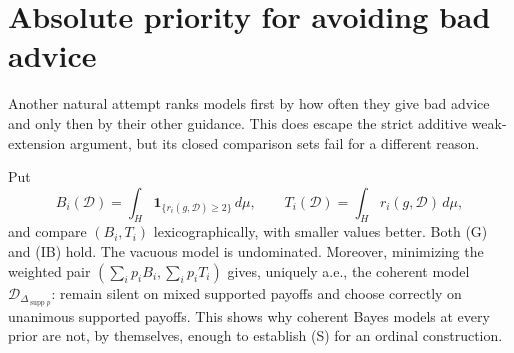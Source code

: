 \documentclass[11pt]{article}
\theoremstyle{remark}\newtheorem{remark}[theorem]{Remark}
\newcommand{\Dscr}{\mathcal D}
\newcommand{\supp}{\operatorname{supp}}
\newcommand{\one}{\mathbf 1}
\begin{document}
\section{Absolute priority for avoiding bad advice}

Another natural attempt ranks models first by how often they give bad
advice and only then by their other guidance. This does escape the strict
additive weak-extension argument, but its closed comparison sets fail for
a different reason.

Put
\[
 B_i(\Dscr)=\int_H\one_{\{r_i(g,\Dscr)\ge2\}}\,d\mu,
 \qquad T_i(\Dscr)=\int_H r_i(g,\Dscr)\,d\mu,
\]
and compare $(B_i,T_i)$ lexicographically, with smaller values better.
Both (G) and (IB) hold. The vacuous model is undominated. Moreover,
minimizing the weighted pair
$(\sum_i p_iB_i,\sum_i p_iT_i)$ gives, uniquely a.e., the coherent model
$\Dscr_{\Delta_{\supp p}}$: remain silent on mixed supported payoffs and
choose correctly on unanimous supported payoffs.
This shows why coherent Bayes models at every prior are not, by themselves,
enough to establish (S) for an ordinal construction.
\end{document}
